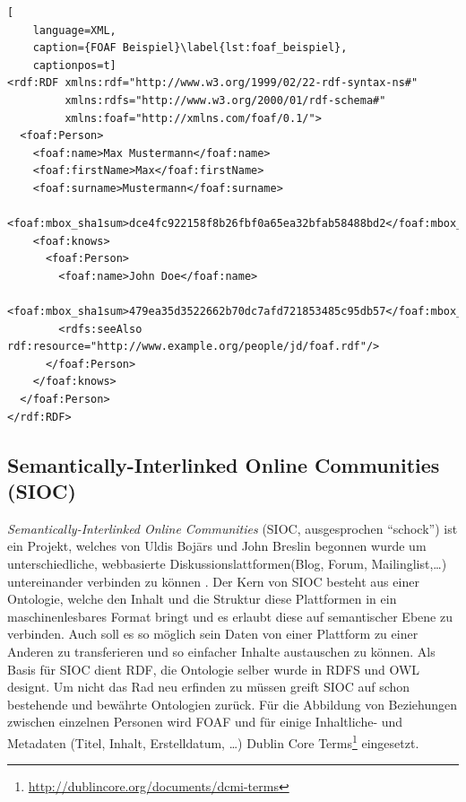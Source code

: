 \begin{lstlisting}[
    language=XML,
    caption={FOAF Beispiel}\label{lst:foaf_beispiel},
    captionpos=t]
<rdf:RDF xmlns:rdf="http://www.w3.org/1999/02/22-rdf-syntax-ns#"
         xmlns:rdfs="http://www.w3.org/2000/01/rdf-schema#"
         xmlns:foaf="http://xmlns.com/foaf/0.1/">
  <foaf:Person>
    <foaf:name>Max Mustermann</foaf:name>
    <foaf:firstName>Max</foaf:firstName>
    <foaf:surname>Mustermann</foaf:surname>
    <foaf:mbox_sha1sum>dce4fc922158f8b26fbf0a65ea32bfab58488bd2</foaf:mbox_sha1sum>
    <foaf:knows>
      <foaf:Person>
        <foaf:name>John Doe</foaf:name>
        <foaf:mbox_sha1sum>479ea35d3522662b70dc7afd721853485c95db57</foaf:mbox_sha1sum>
        <rdfs:seeAlso rdf:resource="http://www.example.org/people/jd/foaf.rdf"/>
      </foaf:Person>
    </foaf:knows>
  </foaf:Person>
</rdf:RDF>
\end{lstlisting}


\subsection{Semantically-Interlinked Online Communities (SIOC)} %
\label{sub:semantically_interlinked_online_communities}


\emph{Semantically-Interlinked Online Communities} (SIOC, ausgesprochen \enquote{schock}) ist ein Projekt, welches von Uldis Boj\=ars und John Breslin begonnen wurde um unterschiedliche, webbasierte Diskussionslattformen(Blog, Forum, Mailinglist,\dots) untereinander verbinden zu können \cite{deri2013,Breslin2005}. Der Kern von SIOC besteht aus einer Ontologie, welche den Inhalt und die Struktur diese Plattformen in ein maschinenlesbares Format bringt und es erlaubt diese auf semantischer Ebene zu verbinden. Auch soll es so möglich sein Daten von einer Plattform zu einer Anderen zu transferieren und so einfacher Inhalte austauschen zu können. Als Basis für SIOC dient RDF, die Ontologie selber wurde in RDFS und OWL designt. Um nicht das Rad neu erfinden zu müssen greift SIOC auf schon bestehende und bewährte Ontologien zurück. Für die Abbildung von Beziehungen zwischen einzelnen Personen wird FOAF und für einige Inhaltliche- und Metadaten (Titel, Inhalt, Erstelldatum, \dots) Dublin Core Terms\footnote{\url{http://dublincore.org/documents/dcmi-terms}} eingesetzt.

